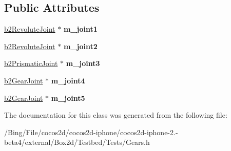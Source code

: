 \subsection*{Public Attributes}
\begin{DoxyCompactItemize}
\item 
\hypertarget{class_gears_a6d7640ab0c6587af575ee2a108d3ba70}{\hyperlink{classb2_revolute_joint}{b2\-Revolute\-Joint} $\ast$ {\bfseries m\-\_\-joint1}}\label{class_gears_a6d7640ab0c6587af575ee2a108d3ba70}

\item 
\hypertarget{class_gears_a0bcf29bef0e56eed4690d9c79b4a12fa}{\hyperlink{classb2_revolute_joint}{b2\-Revolute\-Joint} $\ast$ {\bfseries m\-\_\-joint2}}\label{class_gears_a0bcf29bef0e56eed4690d9c79b4a12fa}

\item 
\hypertarget{class_gears_a0fbb71917e3133e872c5b9a56c7fc1c5}{\hyperlink{classb2_prismatic_joint}{b2\-Prismatic\-Joint} $\ast$ {\bfseries m\-\_\-joint3}}\label{class_gears_a0fbb71917e3133e872c5b9a56c7fc1c5}

\item 
\hypertarget{class_gears_a91551e8db31a5bac24acd61a090da09e}{\hyperlink{classb2_gear_joint}{b2\-Gear\-Joint} $\ast$ {\bfseries m\-\_\-joint4}}\label{class_gears_a91551e8db31a5bac24acd61a090da09e}

\item 
\hypertarget{class_gears_a51d866e6843a8d1657e431c71e7cd560}{\hyperlink{classb2_gear_joint}{b2\-Gear\-Joint} $\ast$ {\bfseries m\-\_\-joint5}}\label{class_gears_a51d866e6843a8d1657e431c71e7cd560}

\end{DoxyCompactItemize}


The documentation for this class was generated from the following file\-:\begin{DoxyCompactItemize}
\item 
/\-Bing/\-File/cocos2d/cocos2d-\/iphone/cocos2d-\/iphone-\/2.-\/beta4/external/\-Box2d/\-Testbed/\-Tests/Gears.\-h\end{DoxyCompactItemize}
